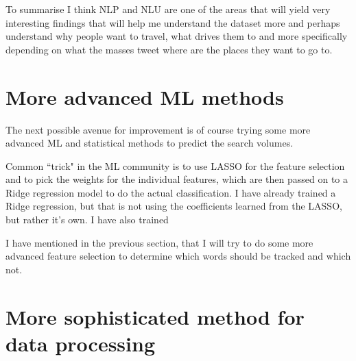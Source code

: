 \documentclass[minf,twoside,singlespacing,parskip,frontabs]{infthesis}
\begin{document}
To summarise I think NLP and NLU are one of the areas that will yield very interesting findings that will help me understand the dataset more and perhaps understand why people want to travel, what drives them to and more specifically depending on what the masses tweet where are the places they want to go to.



\section{More advanced ML methods}


The next possible avenue for improvement is of course trying some more advanced ML and statistical methods to predict the search volumes. 

Common ``trick" in the ML community is to use LASSO for the feature selection and to pick the weights for the individual features, which are then passed on to a Ridge regression model to do the actual classification. I have already trained a Ridge regression, but that is not using the coefficients learned from the LASSO, but rather it's own. I have also trained 

I have mentioned in the previous section, that I will try to do some more advanced feature selection to determine which words should be tracked and which not. 


\section{More sophisticated method for data processing}




\end{document}
